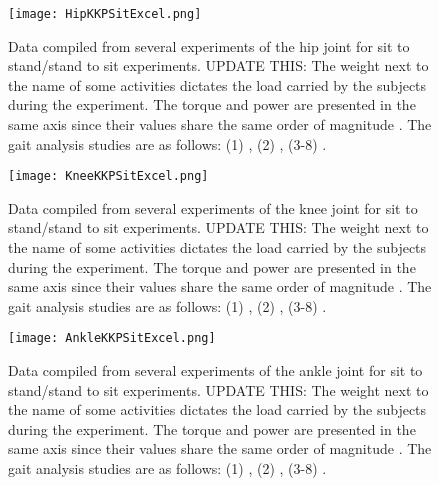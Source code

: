 \begin{appendix}
\begin{figure}[htbp]
    \centering
    \texttt{[image: HipKKPSitExcel.png]}
    \caption{Data compiled from several experiments of the hip joint for sit to stand/stand to sit experiments. UPDATE THIS: The weight next to the name of some activities dictates the load carried by the subjects during the experiment. The torque and power are presented in the same axis since their values share the  same order of magnitude \cite{solis2017characterization}. The gait analysis studies are as follows: (1) \cite{bovi2011multiple}, (2) \cite{lee2008biomechanics}, (3-8) \cite{han2011biomechanical}.  }
    \label{fig:hipKKPSit}
\end{figure}

\begin{figure}[htbp]
    \centering
    \texttt{[image: KneeKKPSitExcel.png]}
    \caption{Data compiled from several experiments of the knee joint for sit to stand/stand to sit experiments. UPDATE THIS: The weight next to the name of some activities dictates the load carried by the subjects during the experiment. The torque and power are presented in the same axis since their values share the  same order of magnitude \cite{solis2017characterization}. The gait analysis studies are as follows: (1) \cite{bovi2011multiple}, (2) \cite{lee2008biomechanics}, (3-8) \cite{han2011biomechanical}. }
    \label{fig:kneeKKPSit}
\end{figure}

\begin{figure}[htbp]
    \centering
    \texttt{[image: AnkleKKPSitExcel.png]}
    \caption{Data compiled from several experiments of the ankle joint for sit to stand/stand to sit experiments. UPDATE THIS: The weight next to the name of some activities dictates the load carried by the subjects during the experiment. The torque and power are presented in the same axis since their values share the  same order of magnitude \cite{solis2017characterization}. The gait analysis studies are as follows: (1) \cite{bovi2011multiple}, (2) \cite{lee2008biomechanics}, (3-8) \cite{han2011biomechanical}. }
    \label{fig:ankleKKPSit}
\end{figure}

\end{appendix}
